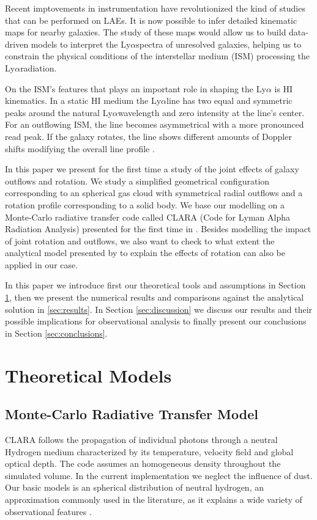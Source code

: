 \documentclass[a4,useAMS,usenatbib,usegraphicx]{mn2e}
\newcommand{\lya}{Ly$\alpha$}
\begin{document}
Recent imptovements in instrumentation have revolutionized the kind of
studies that can be performed on LAEs.  
It is now possible to infer detailed kinematic maps for nearby galaxies.
The study of these maps would allow us to build data-driven models to
interpret the \lya spectra of unresolved galaxies, helping us to
constrain the physical conditions of the interstellar medium (ISM)
processing the \lya radiation.

On the ISM's features that plays an important role in shaping the \lya
is HI kinematics. 
In a static HI medium the \lya line has  two equal and symmetric peaks
around the natural \lya wavelength and zero intensity at the line's
center.
For an outflowing ISM, the line becomes
asymmetrical with a more pronounced read peak.
If the galaxy rotates, the line shows different amounts of Doppler
shifts modifying the overall line profile \cite{Garavito14}.

In this paper we present for the first time a study of the joint
effects of galaxy outflows and rotation.
We study a simplified geometrical configuration corresponding to an
spherical gas cloud with symmetrical radial outflows and a rotation
profile corresponding to a solid body.
We base our modelling on a Monte-Carlo radiative transfer code called
CLARA (Code for Lyman Alpha Radiation Analysis) presented for the
first time in \cite{CLARA}.
Besides modelling the impact of joint rotation and outflows, we also
want to check to what extent the analytical model presented by
\cite{Garavito14} to explain the effects of rotation can also be
applied in our case.

In this paper we introduce first our theoretical tools and assumptions
in Section \ref{sec:theory}, then we present the numerical results and
comparisons against the analytical solution in \ref{sec:results}.
In Section \ref{sec:discussion} we discuss our results and their
possible implications for observational analysis to finally present
our conclusions in Section \ref{sec:conclusions}.


\section{Theoretical Models}
\label{sec:theory}

\subsection{Monte-Carlo Radiative Transfer Model}

CLARA follows the propagation of individual photons through a neutral
Hydrogen medium characterized by its temperature, velocity field and
global optical depth.
The code assumes an homogeneous density throughout the simulated
volume.
In the current implementation we neglect the influence of dust.
Our basic models is an spherical distribution of neutral hydrogen,
an approximation commonly used in the literature, as it explains a
wide variety of observational features \citep{Ahn03,Verhamme06,Dijkstra06}.
\end{document}
